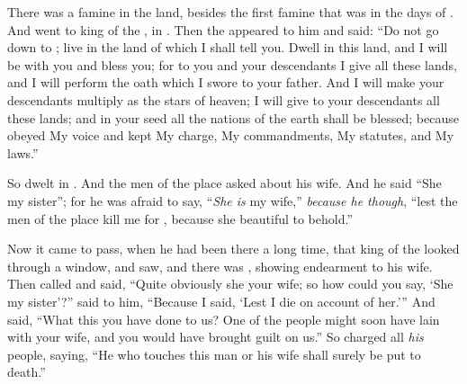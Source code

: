 
\bverse There was a famine in the land, besides the first famine that was in the days of \Abraham. And \Isaac went to \Abimelech king of the , in . 
\bverse Then the \lord appeared to him and said: ``Do not go down to ; live in the land of which I shall tell you.
\bverse Dwell in this land, and I will be with you and bless you; for to you and your descendants I give all these lands, and I will perform the oath which I swore to \Abraham your father.
\bverse And I will make your descendants multiply as the stars of heaven; I will give to your descendants all these lands; and in your seed all the nations of the earth shall be blessed;
\bverse because \Abraham obeyed My voice and kept My charge, My commandments, My statutes, and My laws.''


\bverse So \Isaac dwelt in .
\bverse And the men of the place asked about his wife. And he said ``She \is my sister''; for he was afraid to say, ``\textit{She is} my wife,'' \textit{because he though}, ``lest the men of the place kill me for \Rebekah, because she \is beautiful to behold.''




\bverse Now it came to pass, when he had been there a long time, that \Abimelech king of the  looked through a window, and saw, and there was \Isaac, showing endearment to \Rebekah his wife.
\bverse Then \Abimelech called \Isaac and said, ``Quite obviously she \is your wife; so how could you say, `She \is my sister'?'' \Isaac said to him, ``Because I said, `Lest I die on account of her.'\thinspace''
\bverse And \Abimelech said, ``What \is this you have done to us? One of the people might soon have lain with your wife, and you would have brought guilt on us.''
\bverse So \Abimelech charged all \textit{his} people, saying, ``He who touches this man or his wife shall surely be put to death.''

